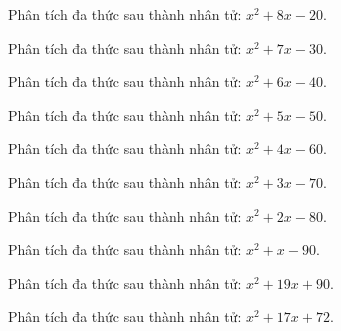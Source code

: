 \begin{bt}
	Phân tích đa thức sau thành nhân tử: $x^2 + 8 x - 20$.
\end{bt}
\begin{bt}
	Phân tích đa thức sau thành nhân tử: $x^2 + 7 x - 30$.
\end{bt}
\begin{bt}
	Phân tích đa thức sau thành nhân tử: $x^2 + 6 x - 40$.
\end{bt}
\begin{bt}
	Phân tích đa thức sau thành nhân tử: $x^2 + 5 x - 50$.
\end{bt}
\begin{bt}
	Phân tích đa thức sau thành nhân tử: $x^2 + 4 x - 60$.
\end{bt}
\begin{bt}
	Phân tích đa thức sau thành nhân tử: $x^2 + 3 x - 70$.
\end{bt}
\begin{bt}
	Phân tích đa thức sau thành nhân tử: $x^2 + 2 x - 80$.
\end{bt}
\begin{bt}
	Phân tích đa thức sau thành nhân tử: $x^2 + x - 90$.
\end{bt}
\begin{bt}
	Phân tích đa thức sau thành nhân tử: $x^2 + 19 x + 90$.
\end{bt}
\begin{bt}
	Phân tích đa thức sau thành nhân tử: $x^2 + 17 x + 72$.
\end{bt}
